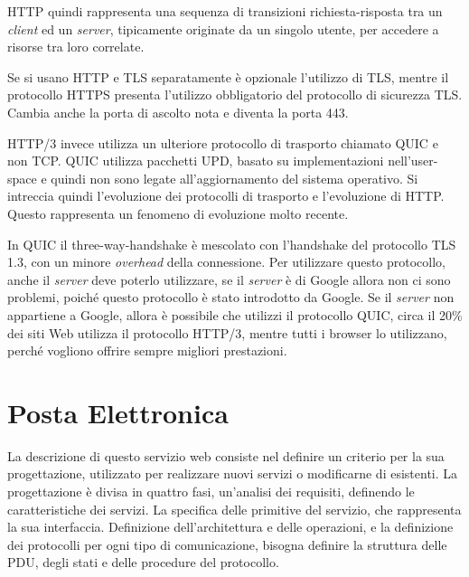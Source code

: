 \documentclass{article}
\numberwithin{equation}{subsection}
\begin{document}
\textcolor{NavyBlue}{HTTP} quindi rappresenta una sequenza di transizioni richiesta-risposta tra un \textit{client} ed un \textit{server}, tipicamente originate da un singolo utente, per accedere 
a risorse tra loro correlate. 

Se si usano \textcolor{NavyBlue}{HTTP} e TLS separatamente è opzionale l'utilizzo di TLS, mentre il protocollo HTTPS presenta l'utilizzo obbligatorio del protocollo di sicurezza 
TLS. Cambia anche la porta di ascolto nota e diventa la porta 443. 


\textcolor{NavyBlue}{HTTP}/3 invece utilizza un ulteriore protocollo di trasporto chiamato QUIC e non \textcolor{Bittersweet}{TCP}. QUIC utilizza pacchetti UPD, basato su implementazioni nell'user-space e quindi 
non sono legate all'aggiornamento del sistema operativo. 
Si intreccia quindi l'evoluzione dei protocolli di trasporto e l'evoluzione di \textcolor{NavyBlue}{HTTP}. 
Questo rappresenta un fenomeno di evoluzione molto recente. 

In QUIC il three-way-handshake è mescolato con l'handshake del protocollo TLS 1.3, con un minore \textit{overhead} della connessione. Per utilizzare questo protocollo, 
anche il \textit{server} deve poterlo utilizzare, se il \textit{server} è di Google allora non ci sono problemi, poiché questo protocollo è stato introdotto da Google. Se il 
\textit{server} non appartiene a Google, allora è possibile che utilizzi il protocollo QUIC, circa il 20\% dei siti Web utilizza il protocollo \textcolor{NavyBlue}{HTTP}/3, mentre tutti i 
browser lo utilizzano, perché vogliono offrire sempre migliori prestazioni. 

\clearpage

\section{Posta Elettronica}

La descrizione di questo servizio web consiste nel definire un criterio per la sua progettazione, utilizzato per realizzare nuovi servizi o modificarne di esistenti. 
La progettazione è divisa in quattro fasi, un'analisi dei requisiti, definendo le caratteristiche dei servizi. La specifica delle primitive del servizio, che rappresenta la sua interfaccia. 
Definizione dell'architettura e delle operazioni, e la definizione dei protocolli per ogni tipo di comunicazione, bisogna definire la struttura delle PDU, degli stati e delle procedure del protocollo. 
\end{document}
